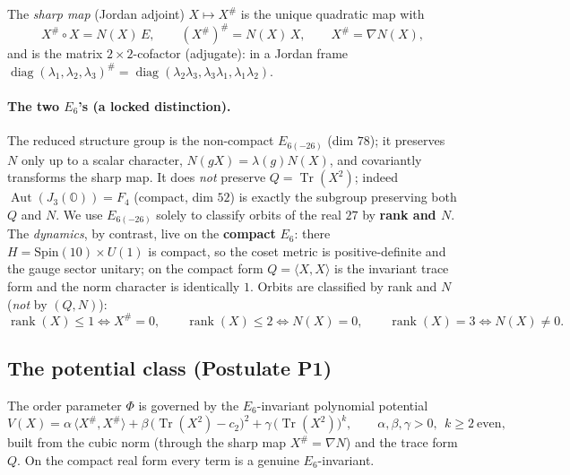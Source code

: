 The \emph{sharp map} (Jordan adjoint) $X\mapsto X^\#$ is the unique quadratic map with
\begin{equation}
\label{eq:potential:sharp}
X^\#\circ X=N(X)\,E,\qquad (X^\#)^\#=N(X)\,X,\qquad X^\#=\nabla N(X),
\end{equation}
and is the matrix $2\times2$-cofactor (adjugate): in a Jordan frame
$\operatorname{diag}(\lambda_1,\lambda_2,\lambda_3)^\#
=\operatorname{diag}(\lambda_2\lambda_3,\lambda_3\lambda_1,\lambda_1\lambda_2)$.

\paragraph{The two $E_6$'s (a locked distinction).}
The reduced structure group is the non-compact $E_{6(-26)}$ (dim $78$); it preserves $N$ only
up to a scalar character, $N(gX)=\lambda(g)N(X)$, and covariantly transforms the sharp map.
It does \emph{not} preserve $Q=\operatorname{Tr}(X^2)$; indeed $\operatorname{Aut}(J_3(\mathbb O))=F_4$
(compact, dim $52$) is exactly the subgroup preserving both $Q$ and $N$. We use $E_{6(-26)}$
solely to classify orbits of the real $27$ by \textbf{rank and $N$}. The \emph{dynamics}, by
contrast, live on the \textbf{compact} $E_6$: there $H=\mathrm{Spin}(10)\times U(1)$ is
compact, so the coset metric is positive-definite and the gauge sector unitary; on the
compact form $Q=\langle X,X\rangle$ is the invariant trace form and the norm character is
identically $1$. Orbits are classified by rank and $N$ (\emph{not} by $(Q,N)$):
\begin{equation}
\label{eq:potential:rank}
\operatorname{rank}(X)\le1\iff X^\#=0,\qquad
\operatorname{rank}(X)\le2\iff N(X)=0,\qquad
\operatorname{rank}(X)=3\iff N(X)\neq0.
\end{equation}

\subsection{The potential class (Postulate P1)}
\label{sec:potential:class}

\begin{postulate}
\label{post:potential:P1}
The order parameter $\Phi$ is governed by the $E_6$-invariant polynomial potential
\begin{equation}
\label{eq:potential:v}
V(X)=\alpha\,\langle X^\#,X^\#\rangle
+\beta\,\bigl(\operatorname{Tr}(X^2)-c_2\bigr)^2
+\gamma\,\bigl(\operatorname{Tr}(X^2)\bigr)^k,
\qquad \alpha,\beta,\gamma>0,\ \ k\ge2\ \text{even},
\end{equation}
built from the cubic norm (through the sharp map $X^\#=\nabla N$) and the trace form $Q$.
On the compact real form every term is a genuine $E_6$-invariant.
\end{postulate}

